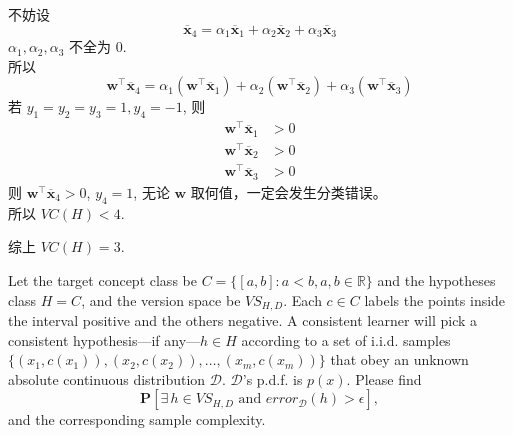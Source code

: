 \documentclass[11pt,letter,notitlepage]{article}
\begin{document}
\begin{solution}
\begin{enumerate}
              不妨设 $$\overline{\mathbf{x}}_4=\alpha_1 \overline{\mathbf{x}}_1 +\alpha_2 \overline{\mathbf{x}}_2 +\alpha_3 \overline{\mathbf{x}}_3$$
              $\alpha_1, \alpha_2, \alpha_3$ 不全为 $0$. \\
              所以
              $$\mathbf{w}^\top \overline{\mathbf{x}}_4
                  = \alpha_1 \left( \mathbf{w}^\top \overline{\mathbf{x}}_1 \right)
                  + \alpha_2 \left( \mathbf{w}^\top \overline{\mathbf{x}}_2 \right)
                  + \alpha_3 \left( \mathbf{w}^\top \overline{\mathbf{x}}_3 \right)$$
              若 $y_1=y_2=y_3=1, y_4=-1$, 则
              $$\begin{aligned}
                      \mathbf{w}^\top \overline{\mathbf{x}}_1 & >0 \\
                      \mathbf{w}^\top \overline{\mathbf{x}}_2 & >0 \\
                      \mathbf{w}^\top \overline{\mathbf{x}}_3 & >0
                  \end{aligned}$$
              则 $\mathbf{w}^\top \overline{\mathbf{x}}_4>0$, $y_4=1$, 无论 $\mathbf{w}$ 取何值，一定会发生分类错误。\\
              所以 $VC(H)<4$.
    \end{enumerate}
    综上 $VC(H)=3$.
\end{solution}

\newpage

\begin{exercise}
    Let the target concept class be $C=\{[a,b]:a<b, a,b\in\mathbb{R}\}$ and the hypotheses class $H=C$, and the version space be $VS_{H,D}$. Each $c\in C$ labels the points inside the interval positive and the others negative. A consistent learner will pick a consistent hypothesis---if any---$h\in H$ according to a set of i.i.d. samples $\{(x_1,c(x_1)),(x_2,c(x_2)),\ldots,(x_m,c(x_m))\}$ that obey an unknown absolute continuous distribution $\mathcal{D}$. $\mathcal{D}$'s p.d.f. is $p(x)$. Please find
    $$\mathbf{P}[\exists\, h\in VS_{H,D} \mbox{ and } error_{\mathcal{D}}(h)>\epsilon],$$
    and the corresponding sample complexity.
\end{exercise}
\end{document}
